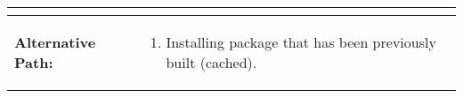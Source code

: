 \begin{tabularx}{\linewidth}{|l|X|}
\begin{minipage}{\linewidth}
\begin{itemize}
  \end{itemize}
  \vspace{0.05em}
\end{minipage}
\\
\hline 
\textbf{Alternative Path:} &
\begin{minipage}{\linewidth}
  \vspace{0.05em} 
  \begin{enumerate}
    \item Installing package that has been previously built (cached).
  \end{enumerate}
  \vspace{0.05em} 
\end{minipage}
\\
\hline
\end{tabularx}

\newpage


